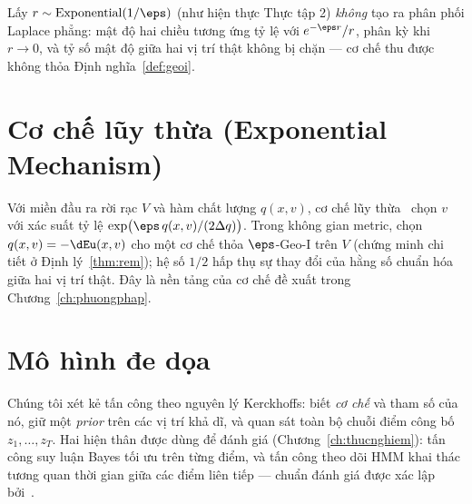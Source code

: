 \begin{nhanxet}
\label{rmk:expbug}
Lấy $r \sim \mathrm{Exponential}(1/\eps)$ (như hiện thực Thực tập 2) \emph{không}
tạo ra phân phối Laplace phẳng: mật độ hai chiều tương ứng tỷ lệ với
$e^{-\eps r}/r$, phân kỳ khi $r \to 0$, và tỷ số mật độ giữa hai vị trí thật
không bị chặn --- cơ chế thu được không thỏa Định nghĩa~\ref{def:geoi}.
\end{nhanxet}

\section{Cơ chế lũy thừa (Exponential Mechanism)}
\label{sec:em}

Với miền đầu ra rời rạc $V$ và hàm chất lượng $q(x, v)$, cơ chế lũy
thừa~\cite{mcsherry2007mechanism} chọn $v$ với xác suất tỷ lệ
$\exp\!\big(\eps\, q(x,v) / (2\Delta q)\big)$. Trong không gian metric, chọn
$q(x,v) = -\dEu(x,v)$ cho một cơ chế thỏa $\eps$-Geo-I trên $V$ (chứng minh chi
tiết ở Định lý~\ref{thm:rem}); hệ số $1/2$ hấp thụ sự thay đổi của hằng số chuẩn
hóa giữa hai vị trí thật. Đây là nền tảng của cơ chế đề xuất trong
Chương~\ref{ch:phuongphap}.

\section{Mô hình đe dọa}
\label{sec:threatmodel}

Chúng tôi xét kẻ tấn công theo nguyên lý Kerckhoffs: biết \emph{cơ chế} và tham
số của nó, giữ một \emph{prior} trên các vị trí khả dĩ, và quan sát toàn bộ chuỗi
điểm công bố $z_1, \dots, z_T$. Hai hiện thân được dùng để đánh giá
(Chương~\ref{ch:thucnghiem}): tấn công suy luận Bayes tối ưu trên từng điểm, và
tấn công theo dõi HMM khai thác tương quan thời gian giữa các điểm liên tiếp
--- chuẩn đánh giá được xác lập bởi~\cite{shokri2011quantifying,xiao2015protecting}.
